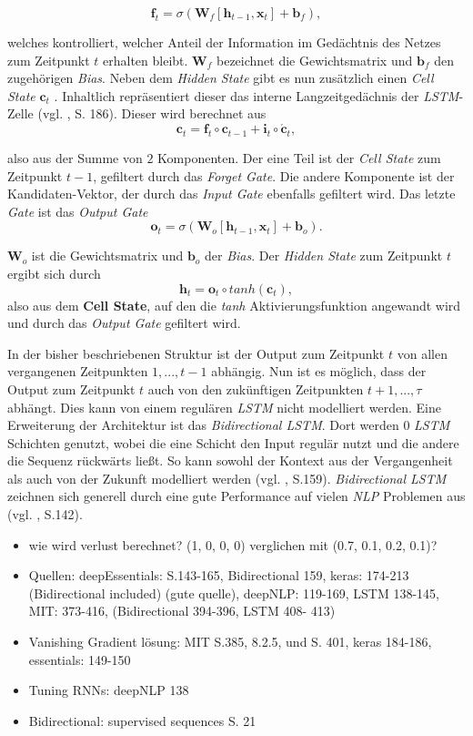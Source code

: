 \documentclass[a4paper,11pt]{article}
\begin{document}
\[  \bm{f}_t = \sigma(\bm{W}_f [\bm{h}_{t-1}, \bm{x}_t] + \bm{b}_f) ,\]

welches kontrolliert, welcher Anteil der Information im Gedächtnis des Netzes zum Zeitpunkt $t$ erhalten bleibt. $\bm{W}_f$ bezeichnet die Gewichtsmatrix und $\bm{b}_f$ den zugehörigen \textit{Bias}. Neben dem \textit{Hidden State} gibt es nun zusätzlich einen \textit{Cell State} $\bm{c}_t$ . Inhaltlich repräsentiert dieser das interne Langzeitgedächnis der \textit{LSTM}-Zelle (vgl. \cite{keras}, S. 186). Dieser wird berechnet aus
\[\bm{c}_t = \bm{f}_t \circ \bm{c}_{t-1} + \bm{i}_t \circ \bm{\acute{c}}_t ,\]

also aus der Summe von $2$ Komponenten. Der eine Teil ist der \textit{Cell State} zum Zeitpunkt $t-1$, gefiltert durch das \textit{Forget Gate}. Die andere Komponente ist der Kandidaten-Vektor, der durch das \textit{Input Gate} ebenfalls gefiltert wird.
Das letzte \textit{Gate} ist das \textit{Output Gate} 
\[  \bm{o}_t = \sigma(\bm{W}_o [\bm{h}_{t-1}, \bm{x}_t] + \bm{b}_o).\]

$\bm{W}_o$ ist die Gewichtsmatrix und $\bm{b}_o$ der \textit{Bias}. Der \textit{Hidden State} zum Zeitpunkt $t$ ergibt sich durch
\[\bm{h}_t = \bm{o}_t \circ tanh(\bm{c}_t) , \]
also aus dem \textbf{Cell State}, auf den die \textit{tanh} Aktivierungsfunktion angewandt wird und durch das \textit{Output Gate} gefiltert wird.  

In der bisher beschriebenen Struktur ist der Output zum Zeitpunkt $t$ von allen vergangenen Zeitpunkten $1,...,t-1$ abhängig. Nun ist es möglich, dass der Output zum Zeitpunkt $t$ auch von den zukünftigen Zeitpunkten $t+1,..., \tau$ abhängt. Dies kann von einem regulären \textit{LSTM} nicht modelliert werden. Eine Erweiterung der Architektur ist das \textit{Bidirectional LSTM}. Dort werden $0$ \textit{LSTM} Schichten genutzt, wobei die eine Schicht den Input regulär nutzt und die andere die Sequenz rückwärts ließt. So kann sowohl der Kontext aus der Vergangenheit als auch von der Zukunft modelliert werden (vgl. \cite{deepEssentials}, S.159).
\textit{Bidirectional LSTM} zeichnen sich generell durch eine gute Performance auf vielen \textit{NLP} Problemen aus (vgl. \cite{deepNLP}, S.142).



\begin{itemize}
\item wie wird verlust berechnet? (1, 0, 0, 0) verglichen mit (0.7, 0.1, 0.2, 0.1)?
    \item Quellen: deepEssentials: S.143-165, Bidirectional 159,  keras: 174-213 (Bidirectional included) (gute quelle),  deepNLP: 119-169, LSTM 138-145, MIT: 373-416, (Bidirectional 394-396, LSTM 408- 413)
    \item Vanishing Gradient lösung: MIT S.385, 8.2.5, und S. 401, keras 184-186, essentials: 149-150
    \item Tuning RNNs: deepNLP 138
    \item Bidirectional: supervised sequences S. 21
\end{itemize}{}
\end{document}
